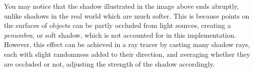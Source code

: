 \noindent
You may notice that the shadow illustrated in the image above ends abruptly, unlike shadows in the real world which are much softer. This is because points on the surfaces of objects can be partly occluded from light sources, creating a \textit{penumbra}, or soft shadow, which is not accounted for in this implementation. However, this effect can be achieved in a ray tracer by casting many shadow rays, each with slight randomness added to their direction, and averaging whether they are occluded or not, adjusting the strength of the shadow accordingly.